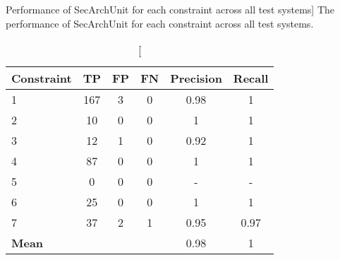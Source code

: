 \begin{table}[h]
\captionsetup{justification=centering}
\caption
    [Performance of SecArchUnit for each constraint across all test systems]
    {The performance of SecArchUnit for each constraint across all test systems.}
\begin{center}
\begin{tabular}{lccccc}
                    \textbf{Constraint}  & \textbf{TP} & \textbf{FP} & \textbf{FN} & \textbf{Precision} & \textbf{Recall} \\
\hline
1 & 167         & 3           & 0           & 0.98      & 1          \\
\rowcolor{RowColor}
2 & 10          & 0           & 0           & 1      & 1          \\
3 & 12          & 1           & 0           & 0.92      & 1          \\
\rowcolor{RowColor}
4 & 87          & 0           & 0           & 1      & 1          \\
5 & 0           & 0           & 0           & -      & -         \\
\rowcolor{RowColor}
6 & 25 & 0 & 0 & 1 & 1 \\
7 & 37 & 2 & 1 & 0.95 & 0.97 \\
\hline
\textbf{Mean}         &             &             &             & 0.98      & 1         
\end{tabular}
\end{center}

\label{tab:secarchUnit_constraint}
\end{table}